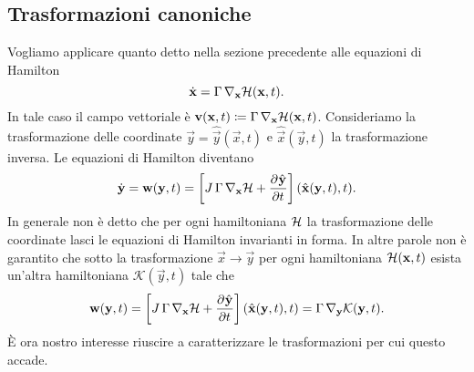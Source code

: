 \subsection{Trasformazioni canoniche}
Vogliamo applicare quanto detto nella sezione precedente alle equazioni di Hamilton
\[
    \dot{\mathbf{x}} = \Gamma \, \nabla_{\mathbf{x}} \mathcal{H}(\mathbf{x}, t).
\]
In tale caso il campo vettoriale è $ \mathbf{v}(\mathbf{x}, t) \coloneqq \Gamma \, \nabla_{\mathbf{x}} \mathcal{H}(\mathbf{x}, t) $. Consideriamo la trasformazione delle coordinate $ \vec{y} = \hat{\vec{y}}(\vec{x}, t) $ e $ \hat{\vec{x}}(\vec{y}, t) $ la trasformazione inversa. Le equazioni di Hamilton diventano
\[
    \dot{\vec{y}} = \vec{w}(\vec{y}, t) = \left[ J \, \Gamma \, \nabla_\vec{x} \ham + \dpd{\hat{\vec{y}}}{t}\right] (\hat{\vec{x}}(\vec{y}, t), t).
\]
In generale non è detto che per ogni hamiltoniana $ \mathcal{H} $ la trasformazione delle coordinate lasci le equazioni di Hamilton invarianti in forma. In altre parole non è garantito che sotto la trasformazione $ \vec{x} \to \vec{y} $ per ogni hamiltoniana $ \mathcal{H}(\mathbf{x}, t) $ esista un'altra hamiltoniana $ \mathcal{K}(\vec{y}, t) $ tale che
\[
    \vec{w}(\vec{y}, t) = \left[ J \, \Gamma \, \nabla_\vec{x} \ham + \dpd{\hat{\vec{y}}}{t}\right] (\hat{\vec{x}}(\vec{y}, t), t) = \Gamma \, \nabla_\vec{y} \mathcal{K}(\vec{y}, t).
\]
È ora nostro interesse riuscire a caratterizzare le trasformazioni per cui questo accade.

